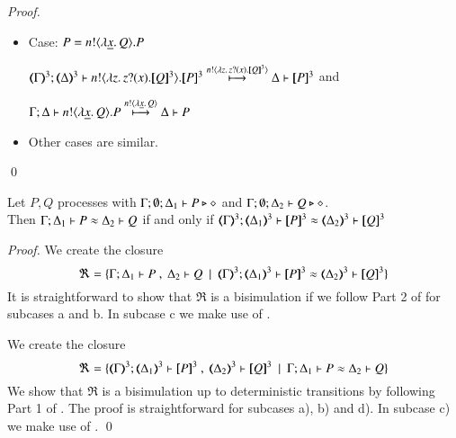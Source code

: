 \begin{proof}
\begin{enumerate}
\begin{itemize}
		\item	Case: $P = n ! \langle \lambda \underline{x}.\,Q \rangle . P$

			$\horel{\tmap{\Gamma}{3}}{\tmap{\Delta}{3}}{\bout{n}{\abs{z} \binp{z}{x} \pmap{Q}{3}} \pmap{P}{3}}{\hby{ \bactout{n}{\abs{z}{\binp{z}{x} \pmap{Q}{3}} } }}{\Delta}{\pmap{P}{3}}$ and

			$\Gamma; \Delta \vdash n ! \langle \lambda \underline{x}.\,Q \rangle . P \stackrel{ n ! \langle \lambda \underline{x}.\,Q \rangle}{\longmapsto} \Delta \vdash P$
		\item Other cases are similar. 
	\end{itemize}
\end{enumerate}
\qed
\end{proof}

\begin{proposition}\myrm
	\label{app:prop:fulla_HOpp_to_HOp}
	Let $P, Q$ \HOpp processes with $\Gamma; \emptyset; \Delta_1 \vdash P \triangleright \diamond$ and 
	$\Gamma; \emptyset; \Delta_2 \vdash Q \triangleright \diamond$. \\
	Then 
	$\Gamma; \Delta_1 \vdash P \approx \Delta_2 \vdash Q$ if and only if $\horel{\tmap{\Gamma}{3}}{\tmap{\Delta_1}{3}}{\pmap{P}{3}}{\wb}{\tmap{\Delta_2}{3}}{\pmap{Q}{3}}$
\end{proposition}

\begin{proof}

	\noi We create the closure
%
	\[
		\Re = \set{\horel{\Gamma}{\Delta_1}{P}{\ ,\ }{\Delta_2}{Q} \setbar \horel{\tmap{\Gamma}{3}}{\tmap{\Delta_1}{3}}{\pmap{P}{3}}{\wb}{\tmap{\Delta_2}{3}}{\pmap{Q}{3}}}
	\]
%
	\noi	It is straightforward to show that $\Re$ is a bisimulation if we follow Part 2 of
		 for subcases a and b.
		In subcase c we make use of .


	\noi We create the closure
%
	\[
		\Re = \set{\horel{\tmap{\Gamma}{3}}{\tmap{\Delta_1}{3}}{\pmap{P}{3}}{\ ,\ }{\tmap{\Delta_2}{3}}{\pmap{Q}{3}} \setbar \horel{\Gamma}{\Delta_1}{P}{\wb}{\Delta_2}{Q}}
	\]
%
	\noi	We show that $\Re$ is a bisimulation up to deterministic transitions
		by following Part 1 of .
		The proof is straightforward for subcases a), b) and d).
		In subcase c) we make use of .
	\qed
\end{proof}



